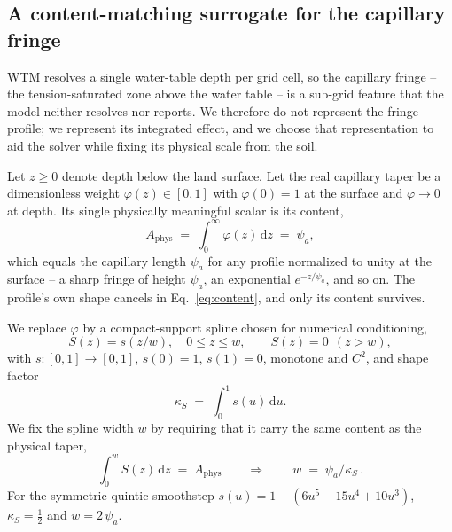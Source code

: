 
\subsection{A content-matching surrogate for the capillary fringe}

WTM resolves a single water-table depth per grid cell, so the capillary fringe -- the
tension-saturated zone above the water table -- is a sub-grid feature that the model neither
resolves nor reports. We therefore do not represent the fringe profile; we represent its integrated
effect, and we choose that representation to aid the solver while fixing its physical scale from the
soil.

Let $z \ge 0$ denote depth below the land surface. Let the real capillary taper be a dimensionless
weight $\varphi(z) \in [0,1]$ with $\varphi(0)=1$ at the surface and $\varphi \to 0$ at depth. Its
single physically meaningful scalar is its content,
\begin{equation}
A_{\mathrm{phys}} \;=\; \int_0^{\infty} \varphi(z)\,\mathrm{d}z \;=\; \psi_a ,
\label{eq:content}
\end{equation}
which equals the capillary length $\psi_a$ for any profile normalized to unity at the surface -- a
sharp fringe of height $\psi_a$, an exponential $e^{-z/\psi_a}$, and so on. The profile's own shape
cancels in Eq.~\eqref{eq:content}, and only its content survives.

We replace $\varphi$ by a compact-support spline chosen for numerical conditioning,
\begin{equation}
S(z) = s\!\left(z/w\right), \quad 0 \le z \le w, \qquad S(z)=0 \ \ (z>w),
\end{equation}
with $s:[0,1]\to[0,1]$, $s(0)=1$, $s(1)=0$, monotone and $C^{2}$, and shape factor
\begin{equation}
\kappa_S \;=\; \int_0^{1} s(u)\,\mathrm{d}u .
\end{equation}
We fix the spline width $w$ by requiring that it carry the same content as the physical taper,
\begin{equation}
\int_0^{w} S(z)\,\mathrm{d}z \;=\; A_{\mathrm{phys}}
\qquad\Longrightarrow\qquad
\boxed{\,w \;=\; \psi_a / \kappa_S\,}.
\label{eq:width}
\end{equation}
For the symmetric quintic smoothstep $s(u)=1-(6u^{5}-15u^{4}+10u^{3})$, $\kappa_S=\tfrac12$ and
$w = 2\,\psi_a$.

